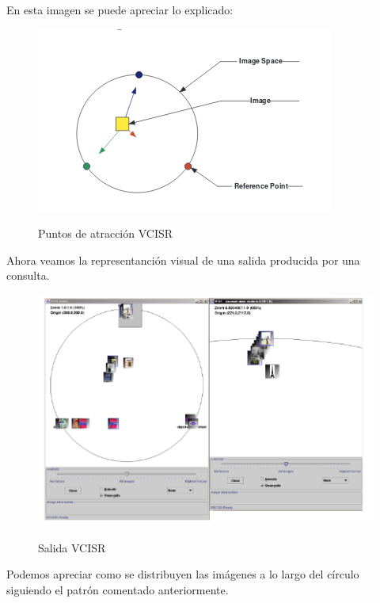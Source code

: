 En esta imagen se puede apreciar lo explicado:\\

\begin{figure}[H] %
\centering
\includegraphics[scale=0.7]{imagenes/VCISR.png}  %
\label{VCISR}
\caption{Puntos de atracción VCISR}
\end{figure}

Ahora veamos la representanción visual de una salida producida por una consulta.\\

\begin{figure}[H] %
\centering
\includegraphics[scale=0.7]{imagenes/VCISR2.png}  %
\label{VCISR}
\caption{Salida VCISR}
\end{figure}

Podemos apreciar como se distribuyen las imágenes a lo largo del círculo siguiendo el patrón comentado anteriormente.\\

